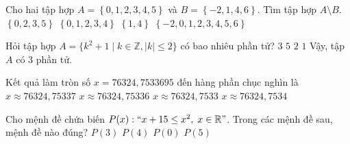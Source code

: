 \begin{ex}%
	Cho hai tập hợp $A = \left\{ 0, 1, 2,  3, 4, 5 \right\}$ và $B = \left\{-2, 1, 4, 6\right \}$. Tìm tập hợp $A \setminus B$.
	\choice
	{\True $\left\{0, 2, 3, 5\right\}$}
	{ $\left\{0, 1, 2, 3, 4\right\}$}
	{$\left\{1, 4\right\} $}
	{$\left\{-2, 0, 1, 2, 3, 4, 5, 6\right\}$}
\end{ex}

\begin{ex}%
	Hỏi tập hợp $A=\{k^2+1\mid k \in \mathbb{Z},|k| \leq 2\}$ có bao nhiêu phần tử?
	\choice
	{\True $3$}
	{$5$}
	{$2$}
	{$1$}
Vậy, tập $A$ có 3 phần tử.
\end{ex}

\begin{ex}%
	Kết quả làm tròn số $x=76324,7533695$ đến hàng phần chục nghìn là
	\choice
	{$x\approx 76324,75337$}
	{$x\approx 76324,75336$}
	{$x\approx 76324,7533$}
	{\True $x\approx 76324,7534$}
	\loigiai{
	}
\end{ex}

\begin{ex}%
	Cho mệnh đề chứa biến $P(x):``x+15 \le x^2,\;x \in \mathbb{R}"$. Trong các mệnh đề sau, mệnh đề nào đúng?
	\choice
	{$P(3) $}
	{$P(4) $}
	{$P(0) $}
	{\True $P(5) $}
\end{ex}

